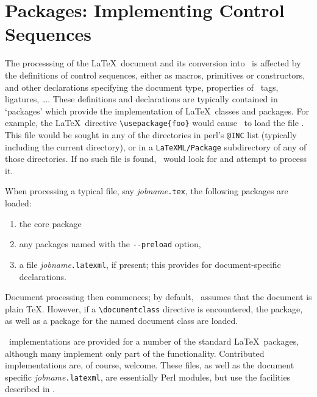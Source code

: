 \documentclass{article}
\begin{document}
\section{Packages: Implementing Control Sequences}\label{sec:packages}
The processsing of the \LaTeX\ document and its  conversion into \XML\ is affected
by the definitions of control sequences, either as macros, primitives or constructors, 
and other declarations specifying the document type, properties of \XML\ tags, ligatures, \ldots.
These definitions and declarations are typically contained in `packages' which provide
the implementation of \LaTeX\ classes and packages.  For example, the \LaTeX\ directive
\verb|\usepackage{foo}| would cause \LaTeXML\ to load the file .
This file would be sought in any of the directories in perl's \verb|@INC| list (typically
including the current directory), or in a \verb|LaTeXML/Package| subdirectory of any of 
those directories.  If no such file is found, \LaTeXML\ would look for  and
attempt to process it.

When processing a typical file, say \textit{jobname}\texttt{.tex}, 
the following packages are loaded:
\begin{enumerate}
\item the core  package
\item any packages named with the \verb|--preload| option,
\item a file \textit{jobname}\texttt{.latexml}, if present;
      this provides for document-specific declarations.
\end{enumerate}
Document processing then commences; by default, \LaTeXML\ assumes that the document is plain \TeX.
However, if a \verb|\documentclass| directive is encountered, the  package, as well
as a package for the named document class are loaded.

\LaTeXML\ implementations are provided for a number of the standard \LaTeX\ packages,
although many implement only part of the functionality.  Contributed implementations are,
of course, welcome.  These files, as well as the document specific \textit{jobname}\texttt{.latexml},
are essentially Perl modules, but use the facilities described in .
\end{document}
